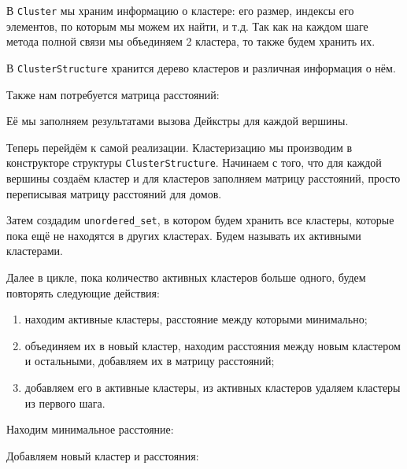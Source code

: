 \documentclass[11pt]{article}
\begin{document}
	В \texttt{Cluster} мы храним информацию о кластере: его размер, индексы его элементов, по которым мы можем их найти, и т.д. Так как на каждом шаге метода полной связи мы объединяем 2 кластера, то также будем хранить их.

	В \texttt{ClusterStructure} хранится дерево кластеров и различная информация о нём.

	

	

	Также нам потребуется матрица расстояний:
	

	Её мы заполняем результатами вызова Дейкстры для каждой вершины.

	Теперь перейдём к самой реализации. Кластеризацию мы производим в конструкторе структуры \texttt{ClusterStructure}. Начинаем с того, что для каждой вершины создаём кластер и для кластеров заполняем матрицу расстояний, просто переписывая матрицу расстояний для домов.

	

	Затем создадим \texttt{unordered\_set}, в котором будем хранить все кластеры, которые пока ещё не находятся в других кластерах. Будем называть их активными кластерами.

	

	Далее в цикле, пока количество активных кластеров больше одного, будем повторять следующие действия:
	\begin{enumerate}
		\item находим активные кластеры, расстояние между которыми минимально;
		\item объединяем их в новый кластер, находим расстояния между новым кластером и остальными, добавляем их в матрицу расстояний;
		\item добавляем его в активные кластеры, из активных кластеров удаляем кластеры из первого шага.
	\end{enumerate}

	Находим минимальное расстояние:
	
	
	Добавляем новый кластер и расстояния:
	
\end{document}
